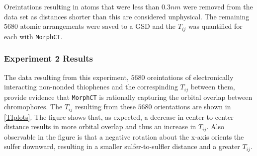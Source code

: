 Oreintations resulting in atoms that were less
than $0.3nm$ were removed from the data set as distances shorter than this are considered
unphysical. The remaining $5680$ atomic arrangements were saved to a GSD and the $T_{ij}$ was quantified for
each with \texttt{MorphCT}. 

\subsubsection{Experiment 2 Results}

The data resulting from this experiment, $5680$ oreintations of electronically 
interacting non-nonded thiophenes and the
correspinding $T_{ij}$ between them, provide evidence that \texttt{MorphCT} is rationally capturing the orbital
overlap between chromophores. 
The $T_{ij}$ resulting from these $5680$ orientations are shown in \autoref{TIplots}. 
The figure shows that, as expected, a decrease in 
center-to-center distance results in more orbital overlap and thus an increase in $T_{ij}$. 
Also observable in the figure is that
a negative rotation about the x-axis orients the sulfer downward, resulting in a smaller sulfer-to-sulfler distance 
and a greater $T_{ij}$. 

